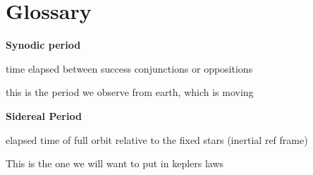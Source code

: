 \documentclass{article}
\begin{document}
\pagebreak
\section{Glossary}

\textbf{\large Synodic period }

\begin{list}{-}{}
\item time elapsed between success conjunctions or oppositions
\item this is the period we observe from earth, which is moving
\end{list}
\noindent
\textbf{\large Sidereal Period} 
\begin{list}{-}{}
\item elapsed time of full orbit relative to the fixed stars (inertial ref frame)
\item This is the one we will want to put in keplers laws
\end{list}
\end{document}
